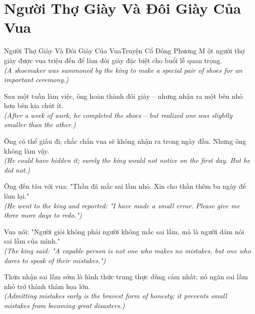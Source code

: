 \section{Người Thợ Giày Và Đôi Giày Của Vua}
\begin{truyen}{Người Thợ Giày Và Đôi Giày Của Vua}{Truyện Cổ Đông Phương}
M ột người thợ giày được vua triệu đến để làm đôi giày đặc biệt cho buổi lễ quan trọng.\\
\textit{(A shoemaker was summoned by the king to make a special pair of shoes for an important ceremony.)}

Sau một tuần làm việc, ông hoàn thành đôi giày -- nhưng nhận ra một bên nhỏ hơn bên kia chút ít.\\
\textit{(After a week of work, he completed the shoes -- but realized one was slightly smaller than the other.)}

Ông có thể giấu đi; chắc chắn vua sẽ không nhận ra trong ngày đầu. Nhưng ông không làm vậy.\\
\textit{(He could have hidden it; surely the king would not notice on the first day. But he did not.)}

Ông đến tâu với vua: "Thần đã mắc sai lầm nhỏ. Xin cho thần thêm ba ngày để làm lại."\\
\textit{(He went to the king and reported: "I have made a small error. Please give me three more days to redo.")}

Vua nói: "Người giỏi không phải người không mắc sai lầm, mà là người dám nói sai lầm của mình."\\
\textit{(The king said: "A capable person is not one who makes no mistakes, but one who dares to speak of their mistakes.")}

\end{truyen}
\begin{baihoc}
  Thừa nhận sai lầm sớm là hình thức trung thực dũng cảm nhất; nó ngăn sai lầm nhỏ trở thành thảm họa lớn.\\
  \textit{(Admitting mistakes early is the bravest form of honesty; it prevents small mistakes from becoming great disasters.)}
\end{baihoc}


